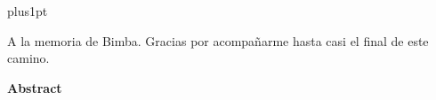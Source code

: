 \documentclass[12pt]{ucmthesis}  %
\theoremstyle{plain}
\theoremstyle{definition}
\theoremstyle{remark}
\theoremstyle{remark}
\begin{document}
\baselineskip=18pt plus1pt

\setcounter{secnumdepth}{3}
\setcounter{tocdepth}{3}



\begin{romanpages}          %

\begin{dedication}
  A la memoria de Bimba. Gracias por acompañarme hasta casi el final de este camino.
\end{dedication}

\begin{resumenlong}
  
  \begin{center}
  \vspace*{1cm}
  {\Large \bfseries  Abstract}
  \end{center}
  \vspace{0.3cm}
  
\end{resumenlong}


\tableofcontents            %
\end{romanpages}            %








%


\newpage
\printbibliography[title={Bibliografía}]
\end{document}
